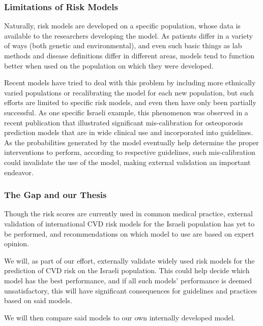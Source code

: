 \documentclass[a4paper,12pt]{article}
\begin{document}
			\subsubsection{Limitations of Risk Models}
		
			Naturally, risk models are developed on a specific population, whose data is available to the researchers developing the model. As patients differ in a variety of ways (both genetic and environmental), and even such basic things as lab methods and disease definitions differ in different areas, models tend to function better when used on the population on which they were developed\cite{DAgostino2001,Bastuji-Garin2002}.
			
			Recent models have tried to deal with this problem by including more ethnically varied populations\cite{DeFilippis2015} or recalibrating the model for each new population\cite{Kanis2008}, but such efforts are limited to specific risk models, and even then have only been partially successful\cite{Dagan2017}. As one specific Israeli example, this phenomenon was observed in a recent publication that illustrated significant mis-calibration for osteoporosis prediction models that are in wide clinical use and incorporated into guidelines\cite{Dagan2017}. As the probabilities generated by the model eventually help determine the proper interventions to perform, according to respective guidelines, such mis-calibration could invalidate the use of the model, making external validation an important endeavor\cite{Moons2012}.
			
			\subsubsection{The Gap and our Thesis}
		
			Though the risk scores are currently used in common medical practice, external validation of international CVD risk models for the Israeli population has yet to be performed, and recommendations on which model to use are based on expert opinion\cite{Bitzur2015}.
			
			We will, as part of our effort, externally validate widely used risk models for the prediction of CVD risk on the Israeli population. This could help decide which model has the best performance, and if all such models' performance is deemed unsatisfactory, this will have significant consequences for guidelines and practices based on said models.
			
			We will then compare said models to our own internally developed model.
			
\end{document}
